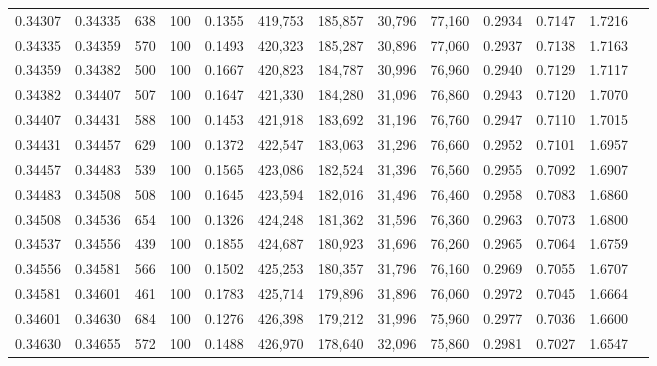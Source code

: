 \begin{tabular}{rrrrrrrrrrrrr}
0.34307 & 0.34335 &    638 & 100 &                                     0.1355 & 419,753 & 185,857 &  30,796 &  77,160 & 0.2934 & 0.7147 & 1.7216 \\
0.34335 & 0.34359 &    570 & 100 &                                     0.1493 & 420,323 & 185,287 &  30,896 &  77,060 & 0.2937 & 0.7138 & 1.7163 \\
0.34359 & 0.34382 &    500 & 100 &                                     0.1667 & 420,823 & 184,787 &  30,996 &  76,960 & 0.2940 & 0.7129 & 1.7117 \\
0.34382 & 0.34407 &    507 & 100 &                                     0.1647 & 421,330 & 184,280 &  31,096 &  76,860 & 0.2943 & 0.7120 & 1.7070 \\
0.34407 & 0.34431 &    588 & 100 &                                     0.1453 & 421,918 & 183,692 &  31,196 &  76,760 & 0.2947 & 0.7110 & 1.7015 \\
0.34431 & 0.34457 &    629 & 100 &                                     0.1372 & 422,547 & 183,063 &  31,296 &  76,660 & 0.2952 & 0.7101 & 1.6957 \\
0.34457 & 0.34483 &    539 & 100 &                                     0.1565 & 423,086 & 182,524 &  31,396 &  76,560 & 0.2955 & 0.7092 & 1.6907 \\
0.34483 & 0.34508 &    508 & 100 &                                     0.1645 & 423,594 & 182,016 &  31,496 &  76,460 & 0.2958 & 0.7083 & 1.6860 \\
0.34508 & 0.34536 &    654 & 100 &                                     0.1326 & 424,248 & 181,362 &  31,596 &  76,360 & 0.2963 & 0.7073 & 1.6800 \\
0.34537 & 0.34556 &    439 & 100 &                                     0.1855 & 424,687 & 180,923 &  31,696 &  76,260 & 0.2965 & 0.7064 & 1.6759 \\
0.34556 & 0.34581 &    566 & 100 &                                     0.1502 & 425,253 & 180,357 &  31,796 &  76,160 & 0.2969 & 0.7055 & 1.6707 \\
0.34581 & 0.34601 &    461 & 100 &                                     0.1783 & 425,714 & 179,896 &  31,896 &  76,060 & 0.2972 & 0.7045 & 1.6664 \\
0.34601 & 0.34630 &    684 & 100 &                                     0.1276 & 426,398 & 179,212 &  31,996 &  75,960 & 0.2977 & 0.7036 & 1.6600 \\
0.34630 & 0.34655 &    572 & 100 &                                     0.1488 & 426,970 & 178,640 &  32,096 &  75,860 & 0.2981 & 0.7027 & 1.6547 \\

\end{tabular}

